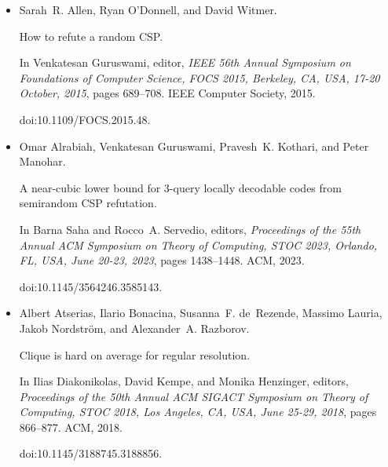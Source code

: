 \begin{itemize}
Lower bounds for polynomial calculus: Non-binomial case.


\emph{Proceedings of the Steklov Institute of Mathematics},
242:18–35, 2003.


Available at
http://people.cs.uchicago.edu/˜razborov/files/misha.pdf. Preliminary
version in \emph{FOCS ’01}.





\item[] 
[6]

Sarah R. Allen, Ryan O’Donnell, and David Witmer.


How to refute a random CSP.


In Venkatesan Guruswami, editor, \emph{IEEE 56th Annual Symposium on
Foundations of Computer Science, FOCS 2015, Berkeley, CA, USA, 17-20
October, 2015}, pages 689–708. IEEE Computer Society, 2015.


doi:10.1109/FOCS.2015.48.





\item[] 
[7]

Omar Alrabiah, Venkatesan Guruswami, Pravesh K. Kothari, and Peter Manohar.


A near-cubic lower bound for 3-query locally decodable codes from
semirandom CSP refutation.


In Barna Saha and Rocco A. Servedio, editors, \emph{Proceedings of the
55th Annual ACM Symposium on Theory of Computing, STOC 2023, Orlando, FL,
USA, June 20-23, 2023}, pages 1438–1448. ACM, 2023.


doi:10.1145/3564246.3585143.





\item[] 
[8]

Albert Atserias, Ilario Bonacina, Susanna F. de Rezende, Massimo Lauria, Jakob
Nordström, and Alexander A. Razborov.


Clique is hard on average for regular resolution.


In Ilias Diakonikolas, David Kempe, and Monika Henzinger, editors,
\emph{Proceedings of the 50th Annual ACM SIGACT Symposium on Theory of
Computing, STOC 2018, Los Angeles, CA, USA, June 25-29, 2018}, pages
866–877. ACM, 2018.


doi:10.1145/3188745.3188856.






\end{itemize}
